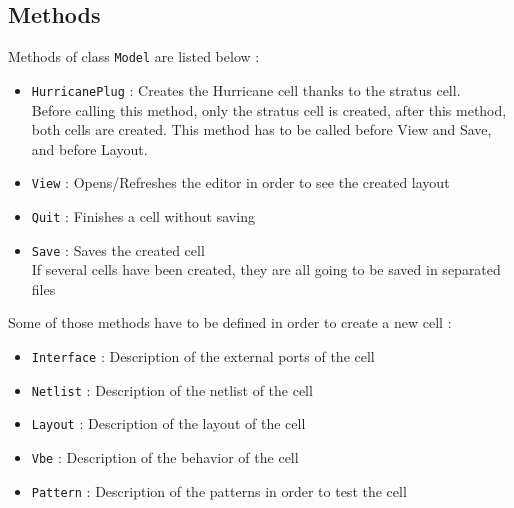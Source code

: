 \subsection{Methods}

Methods of class \verb-Model- are listed below :
\begin{itemize}
    \item \verb-HurricanePlug- : Creates the Hurricane cell thanks to the stratus cell.\\Before calling this method, only the stratus cell is created, after this method, both cells are created. This method has to be called before View and Save, and before Layout.
    \item \verb-View- : Opens/Refreshes the editor in order to see the created layout
    \item \verb-Quit- : Finishes a cell without saving
    \item \verb-Save- : Saves the created cell\\If several cells have been created, they are all going to be saved in separated files\\
\end{itemize}

Some of those methods have to be defined in order to create a new cell :
\begin{itemize}
    \item \verb-Interface- : Description of the external ports of the cell
    \item \verb-Netlist- : Description of the netlist of the cell
    \item \verb-Layout- : Description of the layout of the cell
    \item \verb-Vbe- : Description of the behavior of the cell
    \item \verb-Pattern- : Description of the patterns in order to test the cell
\end{itemize} 
